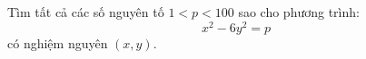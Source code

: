 \ifshowproblem
\begin{problem}\label{example:THA-2015-TSTST-Q-P1}
    Tìm tất cả các số nguyên tố \( 1 < p < 100 \) sao cho phương trình:
    \[
        x^2 - 6y^2 = p
    \]
    có nghiệm nguyên \( (x, y) \).
\end{problem}
\fi

\footnotemark
{}
\fi